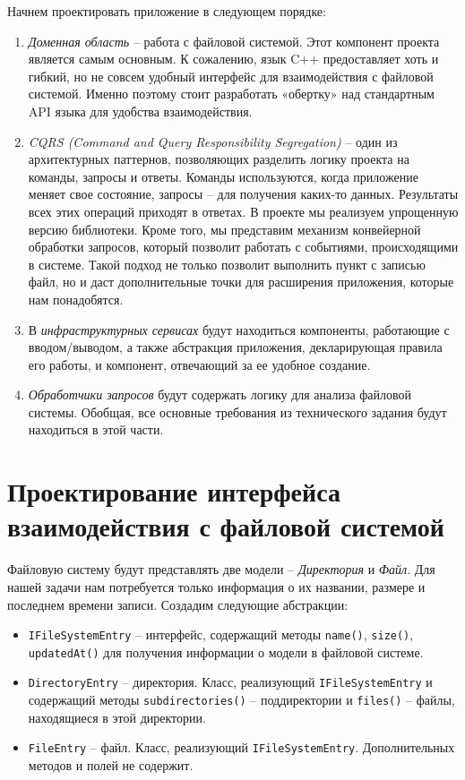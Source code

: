 Начнем проектировать приложение в следующем порядке:
\begin{enumerate}
	\item \textit{Доменная область} – работа с файловой системой. Этот компонент проекта является самым основным. К сожалению, язык C++ предоставляет хоть и гибкий, но не совсем удобный интерфейс для взаимодействия с файловой системой. Именно поэтому стоит разработать «обертку» над стандартным API языка для удобства взаимодействия.
	\item \textit{CQRS (Command and Query Responsibility Segregation)} – один из архитектурных паттернов, позволяющих разделить логику проекта на команды, запросы и ответы. Команды используются, когда приложение меняет свое состояние, запросы – для получения каких-то данных. Результаты всех этих операций приходят в ответах. В проекте мы реализуем упрощенную версию библиотеки. Кроме того, мы представим механизм конвейерной обработки запросов, который позволит работать с событиями, происходящими в системе. Такой подход не только позволит выполнить пункт с записью файл, но и даст дополнительные точки для расширения приложения, которые нам понадобятся.
	\item В \textit{инфраструктурных сервисах} будут находиться компоненты, работающие с вводом/выводом, а также абстракция приложения, декларирующая правила его работы, и компонент, отвечающий за ее удобное создание.
	\item \textit{Обработчики запросов} будут содержать логику для анализа файловой системы. Обобщая, все основные требования из технического задания будут находиться в этой части.
\end{enumerate}

\section{Проектирование интерфейса взаимодействия с файловой системой} \label{ch1:conclusion2}

Файловую систему будут представлять две модели – \textit{Директория} и \textit{Файл}. Для нашей задачи нам потребуется только информация о их названии, размере и последнем времени записи. Создадим следующие абстракции:

\begin{itemize}
	\item \verb|IFileSystemEntry| – интерфейс, содержащий методы \verb|name()|, \verb|size()|, \verb|updatedAt()| для получения информации о модели в файловой системе.
	\item \verb|DirectoryEntry| – директория. Класс, реализующий \verb|IFileSystemEntry| и содержащий методы \verb|subdirectories()| – поддиректории и \verb|files()| – файлы, находящиеся в этой директории.
	\item \verb|FileEntry| – файл. Класс, реализующий \verb|IFileSystemEntry|. Дополнительных методов и полей не содержит.
\end{itemize}

